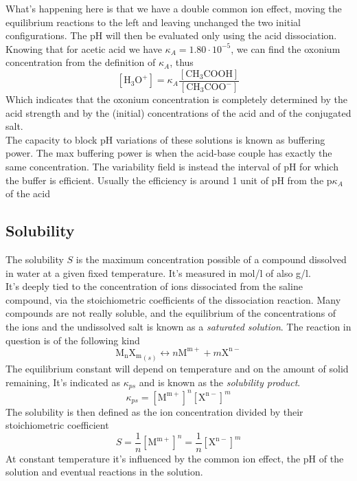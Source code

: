 \documentclass[../qm.tex]{subfiles}
\begin{document}
What's happening here is that we have a double common ion effect, moving the equilibrium reactions to the left and leaving unchanged the two initial configurations. The pH will then be evaluated only using the acid dissociation.\\
Knowing that for acetic acid we have $\kappa_A=1.80\cdot10^{-5}$, we can find the oxonium concentration from the definition of $\kappa_A$, thus
\begin{equation*}
	\left[ \mathrm{H_3O^+} \right]=\kappa_A\frac{\left[ \mathrm{CH_3COOH} \right]}{\left[ \mathrm{CH_3COO^-} \right]}
\end{equation*}
Which indicates that the oxonium concentration is completely determined by the acid strength and by the (initial) concentrations of the acid and of the conjugated salt.\\
The capacity to block pH variations of these solutions is known as buffering power. The max buffering power is when the acid-base couple has exactly the same concentration. The variability field is instead the interval of pH for which the buffer is efficient. Usually the efficiency is around 1 unit of pH from the p$\kappa_A$ of the acid
\subsection{Solubility}
The solubility $S$ is the maximum concentration possible of a compound dissolved in water at a given fixed temperature. It's measured in mol/l of also g/l.\\
It's deeply tied to the concentration of ions dissociated from the saline compound, via the stoichiometric coefficients of the dissociation reaction. Many compounds are not really soluble, and the equilibrium of the concentrations of the ions and the undissolved salt is known as a \emph{saturated solution}. The reaction in question is of the following kind
\begin{equation}
	\mathrm{M_nX_m}_{(s)}\longleftrightarrow n\mathrm{M^{m+}}+m\mathrm{X^{n-}}
	\label{eq:saturationreac.chem}
\end{equation}
The equilibrium constant will depend on temperature and on the amount of solid remaining, It's indicated as $\kappa_{ps}$ and is known as the \emph{solubility product}.\\
\begin{equation}
	\kappa_{ps}=\left[ \mathrm{M^{m+}} \right]^n\left[ \mathrm{X^{n-}} \right]^m
	\label{eq:kps.chem}
\end{equation}
The solubility is then defined as the ion concentration divided by their stoichiometric coefficient
\begin{equation}
	S=\frac{1}{n}\left[ \mathrm{M^{m+}} \right]^n=\frac{1}{n}\left[ \mathrm{X^{n-}} \right]^m
	\label{eq:sol.chem}
\end{equation}
At constant temperature it's influenced by the common ion effect, the pH of the solution and eventual reactions in the solution.
\end{document}
